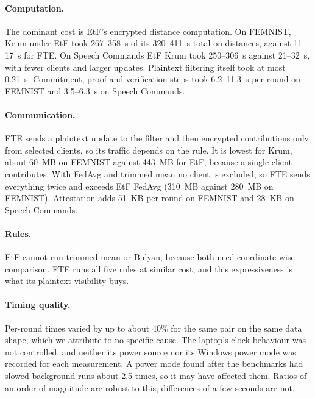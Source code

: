 \paragraph{Computation.}
The dominant cost is EtF's encrypted distance computation. On FEMNIST, Krum under EtF took 267--358~s of its 320--411~s total on distances, against 11--17~s for FTE. On Speech Commands EtF Krum took 250--306~s against 21--32~s, with fewer clients and larger updates. Plaintext filtering itself took at most 0.21~s. Commitment, proof and verification steps took 6.2--11.3~s per round on FEMNIST and 3.5--6.3~s on Speech Commands.

\paragraph{Communication.}
FTE sends a plaintext update to the filter and then encrypted contributions only from selected clients, so its traffic depends on the rule. It is lowest for Krum, about 60~MB on FEMNIST against 443~MB for EtF, because a single client contributes. With FedAvg and trimmed mean no client is excluded, so FTE sends everything twice and exceeds EtF FedAvg (310~MB against 280~MB on FEMNIST). Attestation adds 51~KB per round on FEMNIST and 28~KB on Speech Commands.

\paragraph{Rules.}
EtF cannot run trimmed mean or Bulyan, because both need coordinate-wise comparison. FTE runs all five rules at similar cost, and this expressiveness is what its plaintext visibility buys.

\paragraph{Timing quality.}
Per-round times varied by up to about 40\% for the same pair on the same data shape, which we attribute to no specific cause. The laptop's clock behaviour was not controlled, and neither its power source nor its Windows power mode was recorded for each measurement. A power mode found after the benchmarks had slowed background runs about 2.5 times, so it may have affected them. Ratios of an order of magnitude are robust to this; differences of a few seconds are not.
